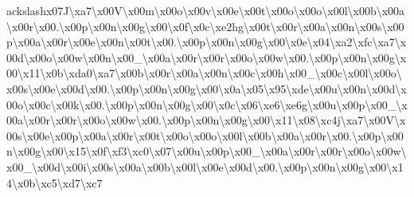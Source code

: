 ackslash{}x07\+J\textbackslash{}xa7\textbackslash{}x00\+V\textbackslash{}x00m\textbackslash{}x00o\textbackslash{}x00v\textbackslash{}x00e\textbackslash{}x00t\textbackslash{}x00o\textbackslash{}x00o\textbackslash{}x00l\textbackslash{}x00b\textbackslash{}x00a\textbackslash{}x00r\textbackslash{}x00.\textbackslash{}x00p\textbackslash{}x00n\textbackslash{}x00g\textbackslash{}x00\textbackslash{}x0f\textbackslash{}x0c\textbackslash{}xe2hg\textbackslash{}x00t\textbackslash{}x00r\textbackslash{}x00a\textbackslash{}x00n\textbackslash{}x00s\textbackslash{}x00p\textbackslash{}x00a\textbackslash{}x00r\textbackslash{}x00e\textbackslash{}x00n\textbackslash{}x00t\textbackslash{}x00.\textbackslash{}x00p\textbackslash{}x00n\textbackslash{}x00g\textbackslash{}x00\textbackslash{}x0e\textbackslash{}x04\textbackslash{}xa2\textbackslash{}xfc\textbackslash{}xa7\textbackslash{}x00d\textbackslash{}x00o\textbackslash{}x00w\textbackslash{}x00n\textbackslash{}x00\+\_\+\textbackslash{}x00a\textbackslash{}x00r\textbackslash{}x00r\textbackslash{}x00o\textbackslash{}x00w\textbackslash{}x00.\textbackslash{}x00p\textbackslash{}x00n\textbackslash{}x00g\textbackslash{}x00\textbackslash{}x11\textbackslash{}x0b\textbackslash{}xda0\textbackslash{}xa7\textbackslash{}x00b\textbackslash{}x00r\textbackslash{}x00a\textbackslash{}x00n\textbackslash{}x00c\textbackslash{}x00h\textbackslash{}x00\+\_\+\textbackslash{}x00c\textbackslash{}x00l\textbackslash{}x00o\textbackslash{}x00s\textbackslash{}x00e\textbackslash{}x00d\textbackslash{}x00.\textbackslash{}x00p\textbackslash{}x00n\textbackslash{}x00g\textbackslash{}x00\textbackslash{}x0a\textbackslash{}x05\textbackslash{}x95\textbackslash{}xde\textquotesingle{}\textbackslash{}x00u\textbackslash{}x00n\textbackslash{}x00d\textbackslash{}x00o\textbackslash{}x00c\textbackslash{}x00k\textbackslash{}x00.\textbackslash{}x00p\textbackslash{}x00n\textbackslash{}x00g\textbackslash{}x00\textbackslash{}x0c\textbackslash{}x06\textbackslash{}xe6\textbackslash{}xe6g\textbackslash{}x00u\textbackslash{}x00p\textbackslash{}x00\+\_\+\textbackslash{}x00a\textbackslash{}x00r\textbackslash{}x00r\textbackslash{}x00o\textbackslash{}x00w\textbackslash{}x00.\textbackslash{}x00p\textbackslash{}x00n\textbackslash{}x00g\textbackslash{}x00\textbackslash{}x11\textbackslash{}x08\textbackslash{}xc4j\textbackslash{}xa7\textbackslash{}x00\+V\textbackslash{}x00s\textbackslash{}x00e\textbackslash{}x00p\textbackslash{}x00a\textbackslash{}x00r\textbackslash{}x00t\textbackslash{}x00o\textbackslash{}x00o\textbackslash{}x00l\textbackslash{}x00b\textbackslash{}x00a\textbackslash{}x00r\textbackslash{}x00.\textbackslash{}x00p\textbackslash{}x00n\textbackslash{}x00g\textbackslash{}x00\textbackslash{}x15\textbackslash{}x0f\textbackslash{}xf3\textbackslash{}xc0\textbackslash{}x07\textbackslash{}x00u\textbackslash{}x00p\textbackslash{}x00\+\_\+\textbackslash{}x00a\textbackslash{}x00r\textbackslash{}x00r\textbackslash{}x00o\textbackslash{}x00w\textbackslash{}x00\+\_\+\textbackslash{}x00d\textbackslash{}x00i\textbackslash{}x00s\textbackslash{}x00a\textbackslash{}x00b\textbackslash{}x00l\textbackslash{}x00e\textbackslash{}x00d\textbackslash{}x00.\textbackslash{}x00p\textbackslash{}x00n\textbackslash{}x00g\textbackslash{}x00\textbackslash{}x14\textbackslash{}x0b\textbackslash{}xc5\textbackslash{}xd7\textbackslash{}xc7\textbacksl